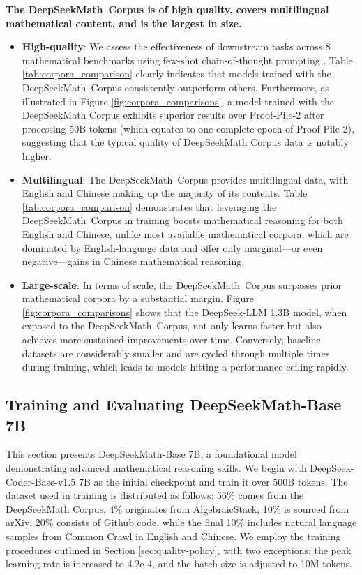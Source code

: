 \begin{itemize}[topsep=0pt]
\textbf{The DeepSeekMath~Corpus is of high quality, covers multilingual mathematical content, and is the largest in size.}

\begin{itemize}[topsep=0pt]
    \item \textbf{High-quality}:
    We assess the effectiveness of downstream tasks across 8 mathematical benchmarks using few-shot chain-of-thought prompting \cite{cot}. Table \ref{tab:corpora_comparison} clearly indicates that models trained with the DeepSeekMath~Corpus consistently outperform others. Furthermore, as illustrated in Figure \ref{fig:corpora_comparisons}, a model trained with the DeepSeekMath Corpus exhibits superior results over Proof-Pile-2 after processing 50B tokens (which equates to one complete epoch of Proof-Pile-2), suggesting that the typical quality of DeepSeekMath Corpus data is notably higher.
    \item \textbf{Multilingual}:
    The DeepSeekMath~Corpus provides multilingual data, with English and Chinese making up the majority of its contents. Table \ref{tab:corpora_comparison} demonstrates that leveraging the DeepSeekMath~Corpus in training boosts mathematical reasoning for both English and Chinese, unlike most available mathematical corpora, which are dominated by English-language data and offer only marginal—or even negative—gains in Chinese mathematical reasoning.
    \item \textbf{Large-scale}:
    In terms of scale, the DeepSeekMath~Corpus surpasses prior mathematical corpora by a substantial margin. Figure \ref{fig:corpora_comparisons} shows that the DeepSeek-LLM 1.3B model, when exposed to the DeepSeekMath~Corpus, not only learns faster but also achieves more sustained improvements over time. Conversely, baseline datasets are considerably smaller and are cycled through multiple times during training, which leads to models hitting a performance ceiling rapidly.
\end{itemize}

\subsection{Training and Evaluating DeepSeekMath-Base 7B}

This section presents DeepSeekMath-Base 7B, a foundational model demonstrating advanced mathematical reasoning skills. We begin with DeepSeek-Coder-Base-v1.5 7B \citep{deepseek-coder} as the initial checkpoint and train it over 500B tokens. The dataset used in training is distributed as follows: 56\% comes from the DeepSeekMath Corpus, 4\% originates from AlgebraicStack, 10\% is sourced from arXiv, 20\% consists of Github code, while the final 10\% includes natural language samples from Common Crawl in English and Chinese. We employ the training procedures outlined in Section \ref{sec:quality-policy}, with two exceptions: the peak learning rate is increased to 4.2e-4, and the batch size is adjusted to 10M tokens.


\end{itemize}
